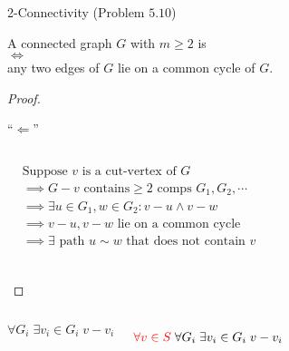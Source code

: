 \begin{frame}{}
  \begin{exampleblock}{2-Connectivity (Problem $5.10$)}
    \begin{center}
      A connected graph $G$ with $m \ge 2$ is  \\[3pt]
      $\iff$ \\[3pt]
      any two  edges of $G$ lie on a common cycle of $G$.
    \end{center}
  \end{exampleblock}

  \begin{proof}
    \begin{center}
      ``$\Longleftarrow$'' \\[6pt]
    \end{center}

    \pause
    \vspace{-0.30cm}
    \begin{columns}
	\begin{align*}
	  &\text{Suppose } v \text{ is a cut-vertex of } G \\
	  &\implies G - v \text{ contains} \ge 2 \text{ comps } G_1, G_2, \cdots \\
	  &\implies \exists u \in G_1, w \in G_2: v-u \land v-w \\
	  &\implies v-u, v-w \text{ lie on a common cycle} \\
	  &\implies \exists \text{ path } u \sim w \text{ that does not contain } v \\
	\end{align*}
    \end{columns}
  \end{proof}
\end{frame}

\begin{frame}{}
  \begin{columns}

      \[
	\forall G_i\; \exists v_i \in G_i\; v - v_i
      \]
      \pause

      \pause
      \[
	\textcolor{red}{\forall v \in S}\; \forall G_i\; \exists v_i \in G_i\; v - v_i
      \]
  \end{columns}
\end{frame}

